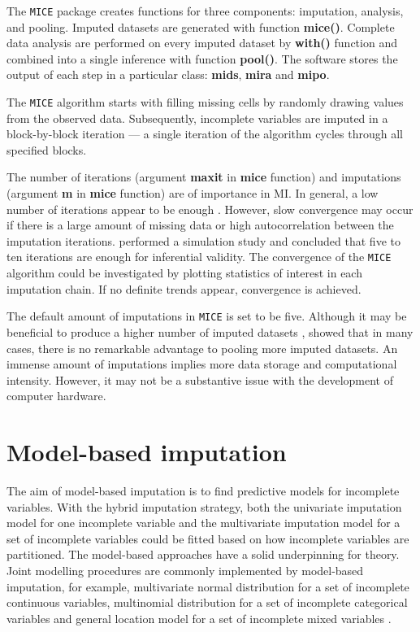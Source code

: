 The \texttt{MICE} package creates functions for three components: imputation, analysis, and pooling.  Imputed datasets are generated with function \textbf{mice()}. Complete data analysis are performed on every imputed dataset by \textbf{with()} function and combined into a single inference with function \textbf{pool()}. The software stores the output of each step in a particular class: \textbf{mids}, \textbf{mira} and \textbf{mipo}. 

The \texttt{MICE} algorithm starts with filling missing cells by randomly drawing values from the observed data. Subsequently, incomplete variables are imputed in a block-by-block iteration — a single iteration of the algorithm cycles through all specified blocks.

The number of iterations (argument \textbf{maxit} in \textbf{mice} function) and imputations (argument \textbf{m} in \textbf{mice} function) are of importance in MI. In general, a low number of iterations appear to be enough \citep{brand1999development, van1999multiple}. However, slow convergence may occur if there is a large amount of missing data or high autocorrelation between the imputation iterations. \citet{oberman2020missing} performed a simulation study and concluded that five to ten iterations are enough for inferential validity. The convergence of the \texttt{MICE} algorithm could be investigated by plotting statistics of interest in each imputation chain. If no definite trends appear, convergence is achieved.  

The default amount of imputations in \texttt{MICE} is set to be five. Although it may be beneficial to produce a higher number of imputed datasets \citep{royston2004multiple, graham2007many, bodner2008improves, white2011multiple}, \citet{schafer1998multiple} showed that in many cases, there is no remarkable advantage to pooling more imputed datasets. An immense amount of imputations implies more data storage and computational intensity. However, it may not be a substantive issue with the development of computer hardware. 

\section{Model-based imputation}
The aim of model-based imputation is to find predictive models for incomplete variables. With the hybrid imputation strategy, both the univariate imputation model for one incomplete variable and the multivariate imputation model for a set of incomplete variables could be fitted based on how incomplete variables are partitioned. The model-based approaches have a solid underpinning for theory. Joint modelling procedures are commonly implemented by model-based imputation, for example, multivariate normal distribution for a set of incomplete continuous variables, multinomial distribution for a set of incomplete categorical variables and general location model for a set of incomplete mixed variables \citep{schafer1997analysis}. 

